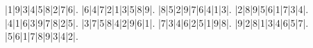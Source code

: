\begin{sudoku}
|1|9|3|4|5|8|2|7|6|.
|6|4|7|2|1|3|5|8|9|.
|8|5|2|9|7|6|4|1|3|.
|2|8|9|5|6|1|7|3|4|.
|4|1|6|3|9|7|8|2|5|.
|3|7|5|8|4|2|9|6|1|.
|7|3|4|6|2|5|1|9|8|.
|9|2|8|1|3|4|6|5|7|.
|5|6|1|7|8|9|3|4|2|.
\end{sudoku}